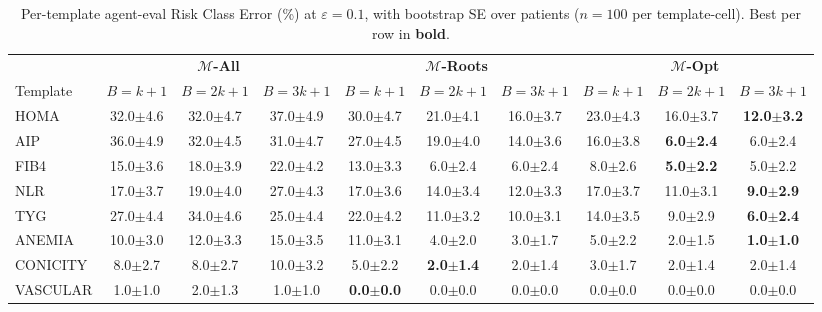 \providecommand{\pmstd}[1]{{\scriptsize $\pm$#1}}

\begin{table}[t]
\centering
\small
\setlength{\tabcolsep}{3pt}
\caption{Per-template agent-eval Risk Class Error (\%) at $\varepsilon = 0.1$, with bootstrap SE over patients ($n = 100$ per template-cell). Best per row in \textbf{bold}.}
\label{tab:agent_rce_eps0.1_app}
\begin{tabular}{l|ccc|ccc|ccc}
\toprule
& \multicolumn{3}{c|}{\textbf{$\mathcal{M}$-All}} & \multicolumn{3}{c|}{\textbf{$\mathcal{M}$-Roots}} & \multicolumn{3}{c}{\textbf{$\mathcal{M}$-Opt}} \\
Template & $B{=}k+1$ & $B{=}2k+1$ & $B{=}3k+1$ & $B{=}k+1$ & $B{=}2k+1$ & $B{=}3k+1$ & $B{=}k+1$ & $B{=}2k+1$ & $B{=}3k+1$ \\
\midrule
HOMA & 32.0\pmstd{4.6} & 32.0\pmstd{4.7} & 37.0\pmstd{4.9} & 30.0\pmstd{4.7} & 21.0\pmstd{4.1} & 16.0\pmstd{3.7} & 23.0\pmstd{4.3} & 16.0\pmstd{3.7} & \textbf{12.0\pmstd{3.2}} \\
AIP & 36.0\pmstd{4.9} & 32.0\pmstd{4.5} & 31.0\pmstd{4.7} & 27.0\pmstd{4.5} & 19.0\pmstd{4.0} & 14.0\pmstd{3.6} & 16.0\pmstd{3.8} & \textbf{6.0\pmstd{2.4}} & 6.0\pmstd{2.4} \\
FIB4 & 15.0\pmstd{3.6} & 18.0\pmstd{3.9} & 22.0\pmstd{4.2} & 13.0\pmstd{3.3} & 6.0\pmstd{2.4} & 6.0\pmstd{2.4} & 8.0\pmstd{2.6} & \textbf{5.0\pmstd{2.2}} & 5.0\pmstd{2.2} \\
NLR & 17.0\pmstd{3.7} & 19.0\pmstd{4.0} & 27.0\pmstd{4.3} & 17.0\pmstd{3.6} & 14.0\pmstd{3.4} & 12.0\pmstd{3.3} & 17.0\pmstd{3.7} & 11.0\pmstd{3.1} & \textbf{9.0\pmstd{2.9}} \\
TYG & 27.0\pmstd{4.4} & 34.0\pmstd{4.6} & 25.0\pmstd{4.4} & 22.0\pmstd{4.2} & 11.0\pmstd{3.2} & 10.0\pmstd{3.1} & 14.0\pmstd{3.5} & 9.0\pmstd{2.9} & \textbf{6.0\pmstd{2.4}} \\
ANEMIA & 10.0\pmstd{3.0} & 12.0\pmstd{3.3} & 15.0\pmstd{3.5} & 11.0\pmstd{3.1} & 4.0\pmstd{2.0} & 3.0\pmstd{1.7} & 5.0\pmstd{2.2} & 2.0\pmstd{1.5} & \textbf{1.0\pmstd{1.0}} \\
CONICITY & 8.0\pmstd{2.7} & 8.0\pmstd{2.7} & 10.0\pmstd{3.2} & 5.0\pmstd{2.2} & \textbf{2.0\pmstd{1.4}} & 2.0\pmstd{1.4} & 3.0\pmstd{1.7} & 2.0\pmstd{1.4} & 2.0\pmstd{1.4} \\
VASCULAR & 1.0\pmstd{1.0} & 2.0\pmstd{1.3} & 1.0\pmstd{1.0} & \textbf{0.0\pmstd{0.0}} & 0.0\pmstd{0.0} & 0.0\pmstd{0.0} & 0.0\pmstd{0.0} & 0.0\pmstd{0.0} & 0.0\pmstd{0.0} \\
\bottomrule
\end{tabular}
\end{table}
